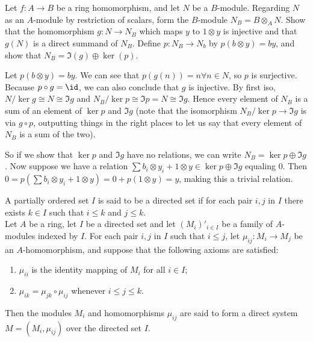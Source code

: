 \begin{questions}
	\question Let $f: A\to B$ be a ring homomorphism, and let $N$ be a $B$-module. Regarding $N$ as an $A$-module by restriction of scalars, form the $B$-module $N_B = B \otimes _A N$. Show that the homomorphism $g: N \to N_B$ which maps $y$ to $1 \otimes  y$ is injective and that $g(N)$ is a direct summand of $N_B$.
	\ifhint
		Define $p: N_B \to N_b$ by $p(b \otimes y) = by $, and show that $N_B = \Im (g) \oplus \ker (p)$.
	\fi
	\begin{solution}
		Let $p(b \otimes y) = by $.
		We can see that $p(g(n)) = n \forall n \in N $, so $p $ is surjective.
		Because $p\circ g = \id $, we can also conclude that $g $ is injective.
		By first iso, $N / \ker g \cong N \cong \Im g $ and $N_B / \ker p \cong \Im p = N \cong \Im g $.
		Hence every element of $N_B $ is a sum of an element of $\ker p $ and $\Im g $ (note that the isomorphism $N_B / \ker p \to \Im g $ is via $g\circ p $, outputting things in the right places to let us say that every element of $N_B $ is a sum of the two).

		So if we show that $\ker p $ and $\Im g $ have no relations, we can write $N_B = \ker p \oplus \Im g $.
		Now suppose we have a relation $\sum b_i \otimes y_i + 1 \otimes y \in \ker p \oplus \Im g$ equaling 0.
		Then $0 = p(\sum b_i \otimes y_i + 1 \otimes y) = 0 + p(1 \otimes y) = y$, making this a trivial relation.
	\end{solution}

	\question A partially ordered set $I$ is said to be a directed set if for each pair $i, j$ in $I$ there exists $k \in I$ such that $i\le k$ and $j\le k$.\\
	Let $A$ be a ring, let $I$ be a directed set and let $(M_i)'_{i\in I}$ be a family of $A$-modules indexed by $I$. For each pair $i,j$ in $I$ such that $i \le j $, let $\mu _{ij}: M_i \to M_j$ be an $A$-homomorphism, and suppose that the following axioms are satisfied:
	\begin{enumerate}
		\item $\mu_{ii}$ is the identity mapping of $M_i$ for all $i\in I $;
		\item $\mu _{ik} = \mu _{jk}\circ \mu _{ij}$ whenever $i\le j \le k$.
	\end{enumerate}
	Then the modules $M_i$ and homomorphisms $\mu_{ij}$ are said to form a direct system $M = (M_i, \mu _{ij})$ over the directed set $I$.


\end{questions}
